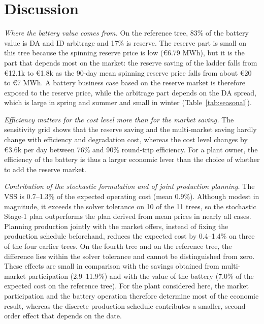 \documentclass[5p,times,twocolumn]{elsarticle}
\begin{document}
\section{Discussion}
\label{sec:discussion}
\textit{Where the battery value comes from.} On the reference tree, 83\% of the battery value is DA and ID arbitrage and 17\% is reserve. The reserve part is small on this tree because the spinning reserve price is low (\euro 6.79 MWh), but it is the part that depends most on the market: the reserve saving of the ladder falls from \euro 12.1k to \euro 1.8k as the 90-day mean spinning reserve price falls from about \euro 20 to \euro 7 MWh. A battery business case based on the reserve market is therefore exposed to the reserve price, while the arbitrage part depends on the DA spread, which is large in spring and summer and small in winter (Table~\ref{tab:seasonal}).

\textit{Efficiency matters for the cost level more than for the market saving.} The sensitivity grid shows that the reserve saving and the multi-market saving hardly change with efficiency and degradation cost, whereas the cost level changes by \euro 3.6k per day between 76\% and 90\% round-trip efficiency. For a plant owner, the efficiency of the battery is thus a larger economic lever than the choice of whether to add the reserve market.

\textit{Contribution of the stochastic formulation and of joint production planning.} The VSS is 0.7--1.3\% of the expected operating cost (mean 0.9\%). Although modest in magnitude, it exceeds the solver tolerance on 10 of the 11 trees, so the stochastic Stage-1 plan outperforms the plan derived from mean prices in nearly all cases. Planning production jointly with the market offers, instead of fixing the production schedule beforehand, reduces the expected cost by 0.4--1.4\% on three of the four earlier trees. On the fourth tree and on the reference tree, the difference lies within the solver tolerance and cannot be distinguished from zero. These effects are small in comparison with the savings obtained from multi-market participation (2.9--11.9\%) and with the value of the battery (7.0\% of the expected cost on the reference tree). For the plant considered here, the market participation and the battery operation therefore determine most of the economic result, whereas the discrete production schedule contributes a smaller, second-order effect that depends on the date.
\end{document}
